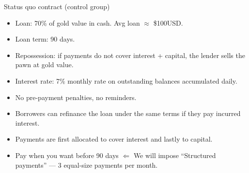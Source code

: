 \documentclass[9pt, aspectratio=169]{beamer}
\begin{document}
\begin{frame}{Status quo contract (control group)}

\begin{itemize}
    \item Loan: 70\% of gold value in cash. Avg loan $\approx$ \$100USD.
    \item Loan term:  90 days.
    \item Repossession: if payments do not cover interest + capital, the lender sells the pawn at gold value.
    \item Interest rate: 7\% monthly rate on outstanding balances accumulated daily.
    \item No pre-payment penalties, no reminders.
    \item Borrowers can refinance the loan under the same terms if they pay incurred interest.
    \item Payments are first allocated to cover interest and lastly to capital.
    \item \alert{Pay when you want} before 90 days $\Leftarrow$ \pause We will impose ``Structured payments'' --- 3 equal-size payments per month.
\end{itemize}
    
\end{frame}
\end{document}
